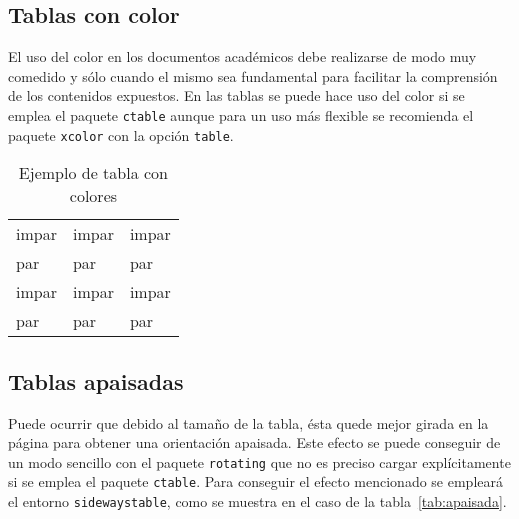 \documentclass[11pt,a4paper]{article}
\begin{document}
\subsection{Tablas con color}
El uso del color en los documentos académicos debe realizarse de modo muy comedido y sólo cuando el mismo sea fundamental para facilitar la comprensión de los contenidos expuestos. En las tablas se puede hace uso del color si se emplea el paquete \texttt{ctable} aunque para un uso más flexible se recomienda el paquete \texttt{xcolor} con la opción \texttt{table}.

\begin{table}[hbt]
	\centering
	\caption[Tabla con color]{Ejemplo de tabla con colores}
	\begin{tabular}{lll}
		impar  & impar  & impar \\
		par    & par    & par   \\
		impar  & impar  & impar \\
		par    & par    & par   \\
	\end{tabular}
\end{table}



\subsection{Tablas apaisadas}
Puede ocurrir que debido al tamaño de la tabla, ésta quede mejor girada en la página para obtener una orientación apaisada. Este efecto se puede conseguir de un modo sencillo con el paquete \texttt{rotating} que no es preciso cargar explícitamente si se emplea el paquete \texttt{ctable}. Para conseguir el efecto mencionado se empleará el entorno \texttt{sidewaystable}, como se muestra en el caso de la tabla~\ref{tab:apaisada}.
\end{document}
